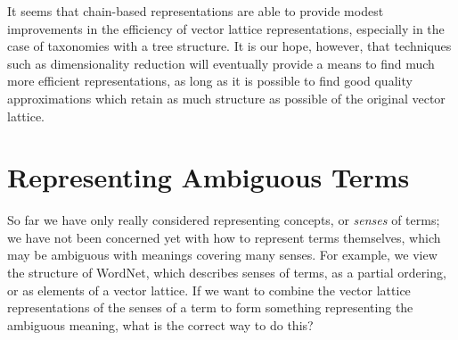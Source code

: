 It seems that chain-based representations are able to provide modest improvements in the efficiency of vector lattice representations, especially in the case of taxonomies with a tree structure. It is our hope, however, that techniques such as dimensionality reduction will eventually provide a means to find much more efficient representations, as long as it is possible to find good quality approximations which retain as much structure as possible of the original vector lattice.





\section{Representing Ambiguous Terms}
\label{representing-words-section}

So far we have only really considered representing concepts, or \emph{senses} of terms; we have not been concerned yet with how to represent terms themselves, which may be ambiguous with meanings covering many senses. For example, we view the structure of WordNet, which describes senses of terms, as a partial ordering, or as elements of a vector lattice. If we want to combine the vector lattice representations of the senses of a term to form something representing the ambiguous meaning, what is the correct way to do this?

